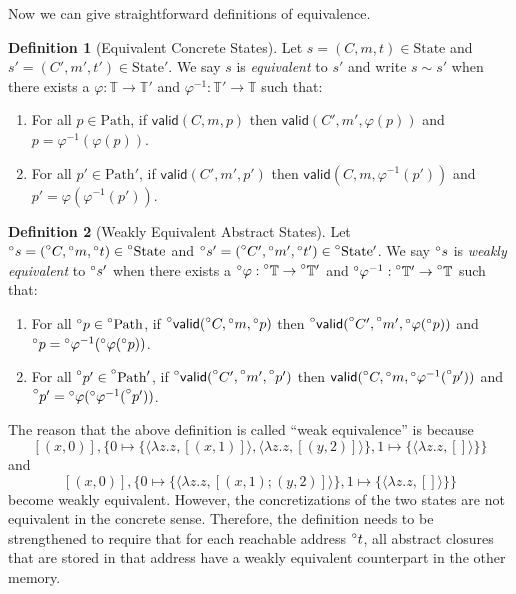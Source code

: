 \documentclass{article}
\theoremstyle{definition}
\newtheorem{definition}{Definition}[section]
\newcommand*{\A}[1]{\prescript{\circ}{}{#1}}
\newcommand*{\Time}{\mathbb{T}}
\newcommand*{\ATime}{\A{\Time}}
\newcommand*{\mem}{m}
\newcommand*{\State}{\text{State}}
\newcommand*{\AState}{\A{\text{State}}}
\newcommand*{\valid}{\mathsf{valid}}
\newcommand*{\Path}{\text{Path}}
\newcommand*{\equivalent}{\sim}
\begin{document}
Now we can give straightforward definitions of equivalence.
\begin{definition}[Equivalent Concrete States]
  Let $s=(C,\mem,t)\in\State$ and $s'=(C',\mem',t')\in\State'$.
  We say $s$ is \emph{equivalent} to $s'$ and write $s\equivalent s'$ when there exists a $\varphi:\Time\rightarrow\Time'$ and $\varphi^{-1}:\Time'\rightarrow\Time$ such that:
  \begin{enumerate}
    \item For all $p\in\Path$, if $\valid(C,\mem,p)$ then $\valid(C',\mem',\varphi(p))$ and $p=\varphi^{-1}(\varphi(p))$.
    \item For all $p'\in\Path'$, if $\valid(C',\mem',p')$ then $\valid(C,\mem,\varphi^{-1}(p'))$ and $p'=\varphi(\varphi^{-1}(p'))$.
  \end{enumerate}
\end{definition}
\begin{definition}[Weakly Equivalent Abstract States]
  Let $\A{s}=(\A{C},\A\mem,\A{t})\in\AState$ and $\A{s}'=(\A{C}',\A\mem',\A{t}')\in\AState'$.
  We say $\A{s}$ is \emph{weakly equivalent} to $\A{s}'$ when there exists a $\A\varphi:\ATime\rightarrow\ATime'$ and $\A\varphi^{-1}:\ATime'\rightarrow\ATime$ such that:
  \begin{enumerate}
    \item For all $\A{p}\in\A\Path$, if $\A\valid(\A{C},\A\mem,\A{p})$ then $\A\valid(\A{C'},\A{\mem'},\A\varphi(\A{p}))$ and $\A{p}=\A\varphi^{-1}(\A\varphi(\A{p}))$.
    \item For all $\A{p'}\in\A{\Path'}$, if $\A\valid(\A{C'},\A{\mem'},\A{p'})$ then $\valid(\A{C},\A{\mem},\A\varphi^{-1}(\A{p'}))$ and $\A{p'}=\A\varphi(\A\varphi^{-1}(\A{p'}))$.
  \end{enumerate}
\end{definition}
The reason that the above definition is called ``weak equivalence'' is because
\[
  [(x,0)],\{0\mapsto\{\langle\lambda z.z,[(x,1)]\rangle,\langle\lambda z.z,[(y,2)]\rangle\},1\mapsto\{\langle\lambda z.z,[]\rangle\}\}
\]
and
\[
  [(x,0)],\{0\mapsto\{\langle\lambda z.z,[(x,1);(y,2)]\rangle\},1\mapsto\{\langle\lambda z.z,[]\rangle\}\}
\]
become weakly equivalent.
However, the concretizations of the two states are not equivalent in the concrete sense.
Therefore, the definition needs to be strengthened to require that for each reachable address $\A{t}$, all abstract closures that are stored in that address have a weakly equivalent counterpart in the other memory.
\end{document}
